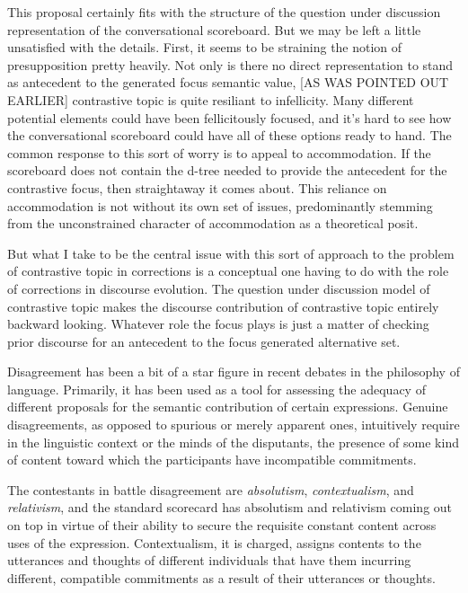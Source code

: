 \documentclass[letterpaper,]{article}
\begin{document}
This proposal certainly fits with the structure of the question under
discussion representation of the conversational scoreboard. But we may
be left a little unsatisfied with the details. First, it seems to be
straining the notion of presupposition pretty heavily. Not only is there
no direct representation to stand as antecedent to the generated focus
semantic value, {[}AS WAS POINTED OUT EARLIER{]} contrastive topic is
quite resiliant to infellicity. Many different potential elements could
have been fellicitously focused, and it's hard to see how the
conversational scoreboard could have all of these options ready to hand.
The common response to this sort of worry is to appeal to accommodation.
If the scoreboard does not contain the d-tree needed to provide the
antecedent for the contrastive focus, then straightaway it comes about.
This reliance on accommodation is not without its own set of issues,
predominantly stemming from the unconstrained character of accommodation
as a theoretical posit.

But what I take to be the central issue with this sort of approach to
the problem of contrastive topic in corrections is a conceptual one
having to do with the role of corrections in discourse evolution. The
question under discussion model of contrastive topic makes the discourse
contribution of contrastive topic entirely backward looking. Whatever
role the focus plays is just a matter of checking prior discourse for an
antecedent to the focus generated alternative set.


Disagreement has been a bit of a star figure in recent debates in the
philosophy of language. Primarily, it has been used as a tool for
assessing the adequacy of different proposals for the semantic
contribution of certain expressions. Genuine disagreements, as opposed
to spurious or merely apparent ones, intuitively require in the
linguistic context or the minds of the disputants, the presence of some
kind of content toward which the participants have incompatible
commitments.

The contestants in battle disagreement are \emph{absolutism},
\emph{contextualism}, and \emph{relativism}, and the standard scorecard
has absolutism and relativism coming out on top in virtue of their
ability to secure the requisite constant content across uses of the
expression. Contextualism, it is charged, assigns contents to the
utterances and thoughts of different individuals that have them
incurring different, compatible commitments as a result of their
utterances or thoughts.
\end{document}
